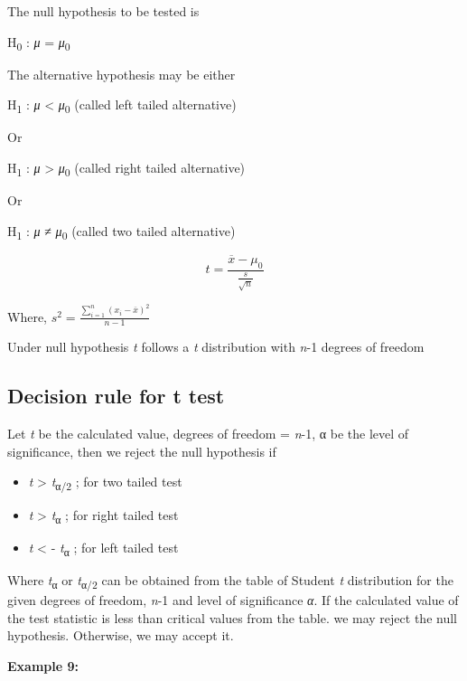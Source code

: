 \documentclass[
]{book}
\begin{document}
The null hypothesis to be tested is

H\textsubscript{0} : \emph{μ} = \emph{μ}\textsubscript{0}

The alternative hypothesis may be either

H\textsubscript{1} : \emph{μ} \textless{} \emph{μ}\textsubscript{0} (called left tailed alternative)

Or

H\textsubscript{1} : \emph{μ} \textgreater{} \emph{μ}\textsubscript{0} (called right tailed alternative)

Or

H\textsubscript{1} : \emph{μ} ≠ \emph{μ}\textsubscript{0} (called two tailed alternative)

\[t = \frac{\overline{x} - \mu_{0}}{\frac{s}{\sqrt{n}}}\]

Where, \(s^{2} = \frac{\sum_{i = 1}^{n}\left( x_{i} - \overline{x} \right)^{2}}{n - 1}\)

Under null hypothesis \emph{t} follows a \emph{t} distribution with \emph{n}-1 degrees of freedom

\hypertarget{decision-rule-for-t-test}{%
\subsection{Decision rule for t test}\label{decision-rule-for-t-test}}

Let \emph{t} be the calculated value, degrees of freedom = \emph{n}-1, α be the level of significance, then we reject the null hypothesis if

\begin{itemize}
\item
  \textbar{}\emph{t}\textbar{} \textgreater{} \emph{t}\textsubscript{α/2} ; for two tailed test
\item
  \emph{t} \textgreater{} \emph{t}\textsubscript{α} ; for right tailed test
\item
  \emph{t} \textless{} - \emph{t}\textsubscript{α} ; for left tailed test
\end{itemize}

Where \emph{t}\textsubscript{α} or \emph{t}\textsubscript{α/2} can be obtained from the table of Student \emph{t} distribution for the given degrees of freedom, \emph{n}-1 and level of significance \emph{α}. If the calculated value of the test statistic is less than critical values from the table. we may reject the null hypothesis. Otherwise, we may accept it.

\textbf{Example 9:}
\end{document}
